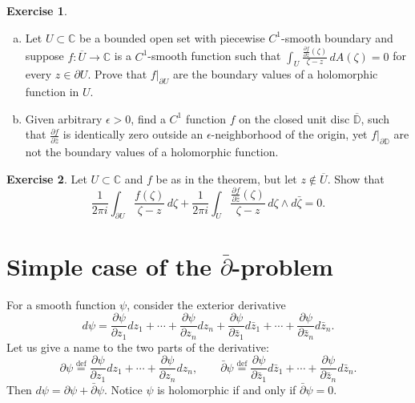 \documentclass[12pt,openany]{book}
\newcommand{\C}{{\mathbb{C}}}
\newcommand{\D}{{\mathbb{D}}}
\theoremstyle{plain}
\theoremstyle{remark}
\theoremstyle{definition}
\newenvironment{exbox}{%
    \def\FrameCommand{\vrule width 1pt \relax\hspace {10pt}}%
    \MakeFramed {\advance \hsize -\width \FrameRestore }%
}{%
    \endMakeFramed
}
\newenvironment{exparts}{%
    \leavevmode\begin{enumerate}[a),noitemsep,topsep=0pt,parsep=0pt,partopsep=0pt]
}{%
    \end{enumerate}
}
\theoremstyle{exercise}
\newtheorem{exercise}{Exercise}[section]
\theoremstyle{example}
\begin{document}
\begin{exbox}
\begin{exercise}
\begin{exparts}
\item
Let $U \subset \C$ be a bounded open set with piecewise $C^1$-smooth boundary and
suppose $f \colon \overline{U} \to \C$ is a $C^1$-smooth function such
that 
$\int_{U} \frac{\frac{\partial f}{\partial \bar{z}}(\zeta)}{\zeta-z} \,
dA(\zeta) =
0$ for every $z \in \partial U$.  Prove that $f|_{\partial U}$ are the boundary
values of a holomorphic function in $U$.
\item
Given arbitrary $\epsilon > 0$, find a $C^1$ function $f$ on the closed unit disc
$\overline{\D}$,
such that $\frac{\partial f}{\partial \bar{z}}$ is identically zero
outside an $\epsilon$-neighborhood of the origin, yet $f|_{\partial \D}$
are not the boundary values of a holomorphic function.
\end{exparts}
\end{exercise}

\begin{exercise}
Let $U \subset \C$ and $f$ be as in the theorem, but let $z \notin
\overline{U}$.  Show that
\begin{equation*}
\frac{1}{2\pi i}
\int_{\partial U}
\frac{f(\zeta)}{\zeta-z}
\,
d \zeta
+
\frac{1}{2\pi i}
\int_{U}
\frac{\frac{\partial f}{\partial \bar{z}}(\zeta)}{\zeta-z}
\,
d\zeta \wedge d\bar{\zeta} 
= 0 .
\end{equation*}
\end{exercise}
\end{exbox}


\section{Simple case of the \texorpdfstring{$\bar{\partial}$}{dbar}-problem}

For a smooth function $\psi$, consider the exterior derivative
%
\begin{equation*}
d \psi =
\frac{\partial \psi}{\partial z_1} dz_1 + \cdots +
\frac{\partial \psi}{\partial z_n} dz_n
+
\frac{\partial \psi}{\partial \bar{z}_1} d\bar{z}_1 + \cdots +
\frac{\partial \psi}{\partial \bar{z}_n} d\bar{z}_n .
\end{equation*}
Let us give a name to the two parts of the derivative:
%
%
\begin{equation*}
\partial \psi \overset{\text{def}}{=}
\frac{\partial \psi}{\partial z_1} dz_1 + \cdots +
\frac{\partial \psi}{\partial z_n} dz_n, \qquad
\bar{\partial} \psi \overset{\text{def}}{=}
\frac{\partial \psi}{\partial \bar{z}_1} d\bar{z}_1 + \cdots +
\frac{\partial \psi}{\partial \bar{z}_n} d\bar{z}_n .
\end{equation*}
Then $d \psi = \partial \psi + \bar{\partial} \psi$.
Notice $\psi$ is holomorphic if and only if $\bar{\partial} \psi = 0$.
\end{document}
